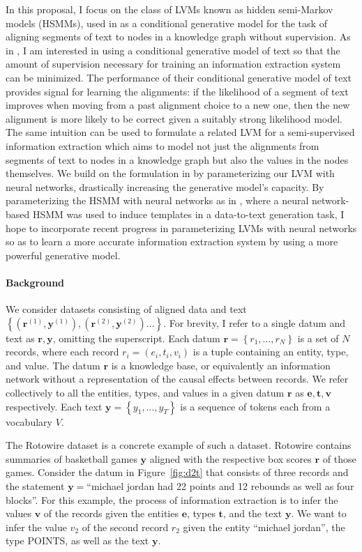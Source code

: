 \documentclass[12pt]{article}
\newcommand\set[1]{\left\{#1\right\}}
\newcommand{\be}{\mathbf{e}}
\newcommand{\br}{\mathbf{r}}
\newcommand{\bt}{\mathbf{t}}
\newcommand{\bv}{\mathbf{v}}
\newcommand{\by}{\mathbf{y}}
\begin{document}
In this proposal, I focus on the class of LVMs known as hidden semi-Markov models (HSMMs),
used in \citet{liang2009semalign} as a conditional generative model for the
task of aligning segments of text to nodes in a knowledge graph without supervision.
As in \citet{liang2009semalign}, I am interested in using a conditional generative model of text so that
the amount of supervision necessary for training an information extraction system can be minimized.
The performance of their conditional generative model of text provides signal for learning the alignments:
if the likelihood of a segment of text improves when moving from a
past alignment choice to a new one,
then the new alignment is more likely to be correct given a suitably strong likelihood model.
The same intuition can be used to formulate a related LVM for a semi-supervised information extraction
which aims to model not just the alignments from segments of text to nodes in a knowledge graph
but also the values in the nodes themselves.
We build on the formulation in \citet{liang2009semalign} by parameterizing our LVM
with neural networks, drastically increasing the generative model's capacity.
By parameterizing the HSMM with neural networks as in \citet{wiseman2018template},
where a neural network-based HSMM was used to induce templates in a data-to-text generation task,
I hope to incorporate recent progress in parameterizing LVMs with neural networks
so as to learn a more accurate information extraction system by using a more powerful
generative model.

\paragraph{Background}
We consider datasets consisting of aligned data and text
$\set{(\br^{(1)}, \by^{(1)}),(\br^{(2)},\by^{(2)})\ldots}$.
For brevity, I refer to a single datum and text as $\br,\by$, omitting the superscript.
Each datum $\br = \set{r_1,\ldots,r_N}$ is a set of $N$ records, where each record $r_i = (e_i, t_i, v_i)$
is a tuple containing an entity, type, and value.
The datum $\br$ is a knowledge base, or equivalently an information network
without a representation of the causal effects between records.
We refer collectively to all the entities, types, and values in a given datum $\br$ as
$\be,\bt,\bv$ respectively.
Each text $\by = \set{y_1,\ldots,y_T}$ is a sequence of tokens each from a vocabulary $V$.

The Rotowire dataset \citep{wiseman2017d2t} is a concrete example of such a dataset.
Rotowire contains summaries of basketball games $\by$ aligned with the respective
box scores $\br$ of those games.
Consider the datum in Figure~\ref{fig:d2t} that consists of three records
and the statement $\by = $``michael jordan had 22 points and 12 rebounds as well as four blocks''.
For this example, the process of information extraction is to infer 
the values $\bv$ of the records given the entities $\be$, types $\bt$, and the text $\by$.
We want to infer the value $v_2$ of the second record $r_2$ given 
the entity ``michael jordan'', the type POINTS, as well as the text $\by$.
\end{document}
